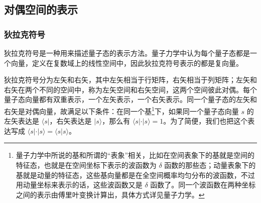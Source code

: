




\subsection{对偶空间的表示}\label{sub_DualSp_1}


\subsubsection{狄拉克符号}

狄拉克符号是一种用来描述量子态的表示方法。量子力学中认为每个量子态都是一个向量，定义在复数域上的线性空间中，因此狄拉克符号表示的都是复向量。

狄拉克符号分为左矢和右矢，其中左矢相当于行矩阵，右矢相当于列矩阵；左矢和右矢在两个不同的空间中，称为左矢空间和右矢空间，这两个空间彼此对偶。每个量子态向量都有双重表示，一个左矢表示，一个右矢表示。同一个量子态的左矢和右矢是对偶向量，故满足以下条件：在同一个基\footnote{量子力学中所说的基和所谓的“表象”相关，比如在空间表象下的基就是空间的特征态，也就是在空间坐标下表示的波函数为 $\delta$ 函数的那些态；动量表象下的基就是动量的特征态，这些基向量都是在全空间概率均匀分布的波函数，不过用动量坐标来表示的话，这些波函数又是 $\delta$ 函数了。同一个波函数在两种坐标之间的表示由傅里叶变换计算出，具体方式详见量子力学。}下，如果同一个量子态向量 $s$ 的左矢表达是 $\langle s|$，右矢表达是 $|s\rangle$，那么有 $\langle s|\cdot|s\rangle=1$。为了简便，我们也把这个表达写成 $\langle s|\cdot|s\rangle=\langle s|s\rangle$。

